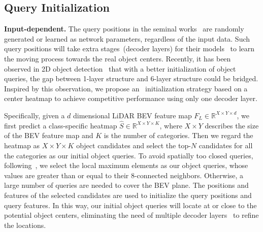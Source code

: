\subsection{Query Initialization}
\label{subsubsec: query_initialize}
\noindent\textbf{Input-dependent.} The query positions in {the seminal} works~\cite{carion2020endtoend, Zhu2021DeformableDD, Sun2020SparseRE} are randomly generated or learned as network parameters{, regardless of the input {data}.}
Such \prevqueryinit~
query positions will take extra stages~(decoder layers) for 
{their models~\cite{carion2020endtoend, Zhu2021DeformableDD}}
to learn the moving process towards the real object centers. Recently, it has been {observed} in 2D object detection~\cite{Yao2021EfficientDI} that with a better initialization of object queries, the gap between 1-layer structure and 6-layer structure could be bridged. 
{Inspired by this observation,}
we propose an \ourqueryinit~initialization strategy based on a center heatmap to achieve competitive performance using only one decoder layer. 

{Specifically}, given a $d$ dimensional LiDAR BEV feature map $F_{L} \in \mathbb{R}^{X\times Y\times d}$, we first predict a class-specific heatmap $\hat S \in \mathbb{R}^{X\times Y\times K}$, where $X\times Y$ {describes} the size of {the} BEV feature map and $K$ is the number of categories. Then we regard the heatmap as $X\times Y\times K$ object candidates and select the top-$N$ candidates {for all the categories} as our initial object queries. 
To avoid spatially too closed queries, following~\cite{Zhou2019ObjectsAP},
we select {the} local maximum elements {as our object queries},
whose values are greater than or equal to {their} 8-connected neighbors. Otherwise{,} a large number of queries are needed to cover the BEV plane. 
The positions and features of the selected candidates are used to initialize the query positions and query features. In this way, our initial object queries will locate at or close to the potential object centers, eliminating the need of multiple decoder layers~\cite{misra20213detr, Liu2021GroupFree3O, Wang2021ObjectD3} to refine the locations.






